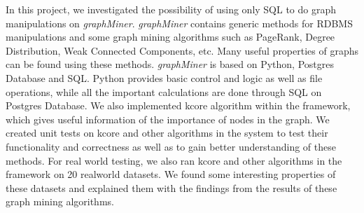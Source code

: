 In this project, we investigated the possibility of using only SQL to do graph manipulations
on {\em graphMiner}. 
{\em graphMiner} contains generic methods for RDBMS manipulations and some graph mining algorithms such as PageRank, Degree Distribution, Weak Connected Components, etc. Many useful properties of graphs can be found using these methods. {\em graphMiner} is based on Python, Postgres Database and SQL. Python provides basic control and logic as well as file operations, while all the important calculations are done through SQL on Postgres Database. 
We also implemented kcore algorithm within the framework, which gives useful information of the importance of nodes in the graph.
We created unit tests on kcore and other algorithms in the system to test their functionality and correctness as well as to gain better understanding of these methods. 
For real world testing, we also ran kcore and other algorithms in the framework on 20 realworld datasets. We found some interesting properties of these datasets and explained them with the findings from the results of these graph mining algorithms.
